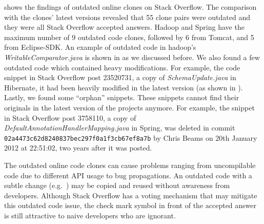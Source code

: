 \documentclass{sig-alternate-05-2015}
\begin{document}
 shows the findings of outdated online clones on Stack Overflow. The comparison with the clones' latest versions revealed that 55 clone pairs were outdated and they were all Stack Overflow accepted answers. Hadoop and Spring have the maximum number of 9 outdated code clones, followed by 6 from Tomcat, and 5 from Eclipse-SDK. An example of outdated code in hadoop's \textit{WritableComparator.java} is shown in  as we discussed before. We also found a few outdated code which contained heavy modifications. For example, the code snippet in Stack Overflow post 23520731, a copy of \textit{SchemaUpdate.java} in Hibernate, it had been heavily modified in the latest version (as shown in ). Lastly, we found some ``orphan'' snippets. These snippets cannot find their originals in the latest version of the projects anymore. For example, the snippet in Stack Overflow post 3758110, a copy of \textit{DefaultAnnotationHandlerMapping.java} in Spring, was deleted in commit \texttt{02a4473c62d8240837bec297f0a1f3cb67ef8a7b} by Chris Beams on 20th January 2012 at 22:51:02, two years after it was posted. %

The outdated online code clones can cause problems ranging from uncompilable code due to different API usage to bug propagations. An outdated code with a subtle change (e.g.~) may be copied and reused without awareness from developers. Although Stack Overflow has a voting mechanism that may mitigate this outdated code issue, the check mark symbol in front of the accepted answer is still attractive to naive developers who are ignorant.
\end{document}
